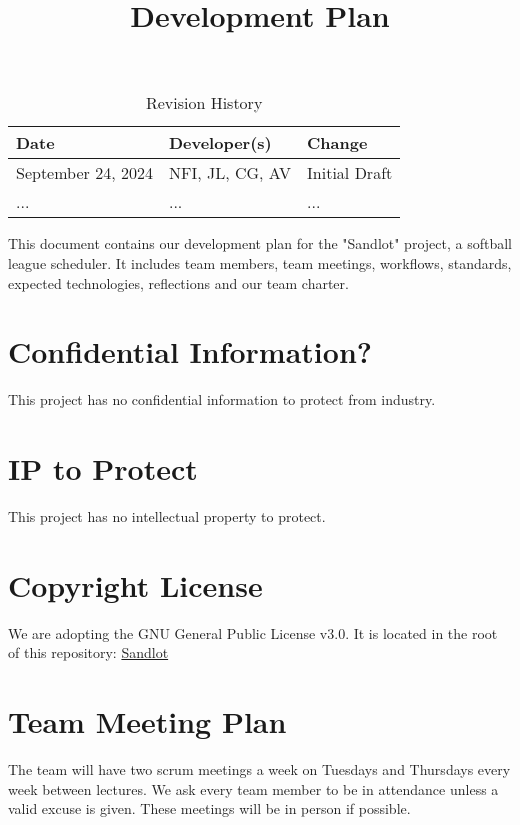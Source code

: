 \documentclass{article}
\title{Development Plan\\\progname}
\author{\authname}
\date{}
\begin{document}
\maketitle

\begin{table}[hp]
\caption{Revision History} \label{TblRevisionHistory}
\begin{tabularx}{\textwidth}{llX}
\toprule
\textbf{Date} & \textbf{Developer(s)} & \textbf{Change}\\
\midrule
September 24, 2024 & NFI, JL, CG, AV & Initial Draft\\
... & ... & ...\\
\bottomrule
\end{tabularx}
\end{table}

\newpage{}

This document contains our development plan for the "Sandlot" project, a
softball league scheduler. It includes team members, team meetings, workflows,
standards, expected technologies, reflections and our team charter.

\section{Confidential Information?}

This project has no confidential information to protect from industry.

\section{IP to Protect}

This project has no intellectual property to protect.

\section{Copyright License}

We are adopting the GNU General Public License v3.0. It is located 
in the root of this repository: \href{https://github.com/Nicholas-Fabugais-Inaba/Sandlot/blob/main/LICENSE}{Sandlot}

\section{Team Meeting Plan}

The team will have two scrum meetings a week on Tuesdays and Thursdays every week
between lectures. We ask every team member to be in attendance unless a valid
excuse is given. These meetings will be in person if possible.\newline
\end{document}
